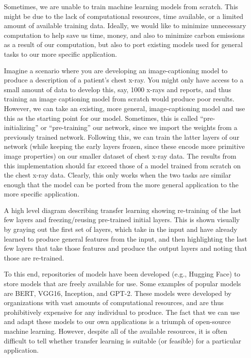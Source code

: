 {{{{    Sometimes, we are unable to train machine learning models from scratch. This might be due to the lack of computational resources, time available, or a limited amount of available training data. Ideally, we would like to minimize unnecessary computation to help save us time, money, and also to minimize carbon emissions as a result of our computation, but also to port existing models used for general tasks to our more specific application.
    
    Imagine a scenario where you are developing an image-captioning model to produce a description of a patient’s chest x-ray. You might only have access to a small amount of data to develop this, say, 1000 x-rays and reports, and thus training an image captioning model from scratch would produce poor results. However, we can take an existing, more general, image-captioning model and use this as the starting point for our model. Sometimes, this is called “pre-initializing” or “pre-training” our network, since we import the weights from a previously trained network. Following this, we can train the latter layers of our network (while keeping the early layers frozen, since these encode more primitive image properties) on our smaller dataset of chest x-ray data. The results from this implementation should far exceed those of a model trained from scratch on the chest x-ray data. Clearly, this only works when the two tasks are similar enough that the model can be ported from the more general application to the more specific application.
    
    
    A high level diagram describing transfer learning showing re-training of the last few layers and freezing/reusing pre-trained initial layers. This is shown visually by graying out the first set of layers, which take in the input and have already learned to produce general features from the input, and then highlighting the last few layers that take those features and produce the output layers and noting that those are re-trained.
    
    To this end, repositories of models have been developed (e.g., Hugging Face) to store models that are freely available for use. Some examples of popular models are BERT, VGG16, Inception, and GPT-2. These models were developed by organizations with vast amounts of computational resources, and are thus prohibitively expensive for any individual to produce. The fact that we can use and adapt these models to our own applications is a triumph of open-source machine learning. However, despite all of the available resources, it is often difficult to tell whether transfer learning is suitable (or feasible) for a particular application.
    
}}}}
